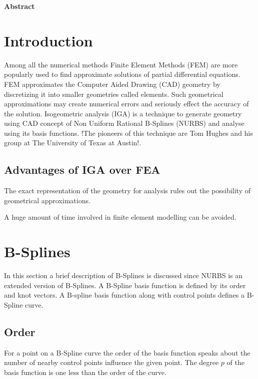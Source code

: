 \documentclass[12pt]{article}
\begin{document}
	\clearpage
	\textbf{\LARGE Abstract}\\ \newline
	\newline
	
	
	\newpage
	\clearpage
	\tableofcontents
	\clearpage
	
\section{Introduction}
Among all the numerical methods Finite Element Methods (FEM) are more popularly used to find approximate solutions of partial differential equations. FEM approximates the Computer Aided Drawing (CAD) geometry by discretizing it into smaller geometries called elements. Such geometrical approximations may create numerical errors and seriously effect the accuracy of the solution.
Isogeometric analysis (IGA) is a technique to generate geometry using CAD concept of Non Uniform Rational B-Splines (NURBS) and analyse using its basis functions. !The pioneers of this technique are Tom Hughes and his group at The University of Texas at Austin!.


\subsection{Advantages of IGA over FEA}
\begin{description}[leftmargin=*]
	\item[$\bullet$]   The exact representation of the geometry for analysis rules out the possibility of geometrical approximations.
	\item[$\bullet$]   A huge amount of time involved in finite element modelling can be avoided.
\end{description}

\section{B-Splines } \label{BSplines}
In this section a brief description of B-Splines is discussed since NURBS is an extended version of B-Splines. A B-Spline basis function is defined by its order and knot vectors. A B-spline basis function along with control points defines a B-Spline curve.
\subsection{Order }
For a point on a B-Spline curve the order of the basis function speaks about the number of nearby control points influence the given point. The degree $p$ of the basis function is one less than the order of the curve.
\end{document}
